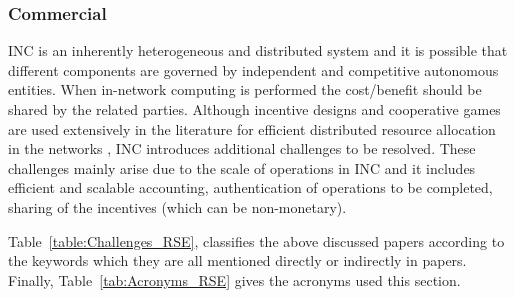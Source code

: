 \subsubsection{Commercial}\label{INC_business}
INC is an inherently heterogeneous and distributed system and it is possible that different components are governed by independent and competitive autonomous entities.  When in-network computing is performed the cost/benefit should be shared by the related parties.  Although incentive designs and cooperative games are used extensively in the literature for efficient distributed resource allocation in the networks \cite{zhan2020incentive, tang2020communication}, INC introduces additional challenges to be resolved.  These challenges mainly arise due to the scale of operations in INC and it includes efficient and scalable accounting, authentication of operations to be completed, sharing of the incentives (which can be non-monetary).  

Table~\ref{table:Challenges_RSE}, classifies the above discussed papers according to the keywords which they are all mentioned directly or indirectly in papers. Finally, Table~\ref{tab:Acronyms_RSE} gives the acronyms used this section.


